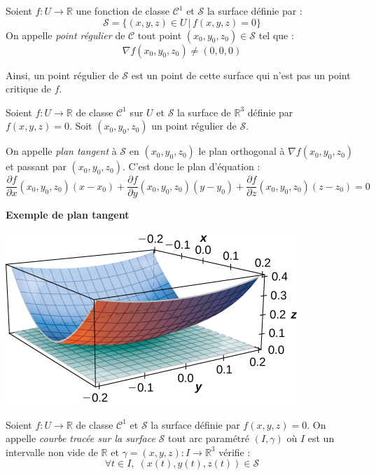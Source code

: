 \documentclass[french,11pt,twoside]{VcCours}
\begin{document}
\begin{Definition}{} Soient $f : U \rightarrow \mathbb{R}$ une fonction de classe $\mathcal{C}^1$ et $\mathcal{S}$ la surface définie par :
$$ \mathcal{S} = \lbrace (x,y,z) \in U \, \vert \, f(x,y,z)=0 \rbrace$$
On appelle \emph{point régulier} de $\mathcal{C}$ tout point $(x_0,y_0,z_0) \in \mathcal{S}$ tel que :
$$ \nabla f(x_0,y_0,z_0) \neq (0,0,0)$$
\end{Definition}

Ainsi, un point régulier de $\mathcal{S}$ est un point de cette surface qui n'est pas un point critique de $f$.

\begin{Definition}{} Soient $f : U \rightarrow \mathbb{R}$ de classe $\mathcal{C}^1$ sur $U$ et $\mathcal{S}$ la surface de $\mathbb{R}^3$ définie par $f(x,y,z)=0$. Soit $(x_0,y_0,z_0)$ un point régulier de $\mathcal{S}$.

On appelle \emph{plan tangent} à $\mathcal{S}$ en $(x_0,y_0,z_0)$ le plan orthogonal à $\nabla f(x_0,y_0,z_0)$ et passant par $(x_0,y_0,z_0)$. C'est donc le plan d'équation :
$$ \dfrac{\partial f}{\partial x}(x_0,y_0,z_0) (x-x_0) +  \dfrac{\partial f}{\partial y}(x_0,y_0,z_0) (y-y_0) +  \dfrac{\partial f}{\partial z}(x_0,y_0,z_0) (z-z_0) = 0$$
\end{Definition}

\medskip

\begin{center}
\textbf{Exemple de plan tangent}
\end{center}

\begin{center}
\includegraphics[scale=1]{tan}
\end{center}

\begin{Definition}{} Soient $f : U \rightarrow \mathbb{R}$ de classe $\mathcal{C}^1$ et $\mathcal{S}$ la surface définie par $f(x,y,z)=0$. On appelle \emph{courbe tracée sur la surface} $\mathcal{S}$ tout arc paramétré $(I, \gamma)$ où $I$ est un intervalle non vide de $\mathbb{R}$ et $ \gamma =(x,y,z) : I \rightarrow \mathbb{R}^3$ vérifie :
$$ \forall t \in I, \; (x(t),y(t),z(t)) \in \mathcal{S}$$
\end{Definition}
\end{document}
